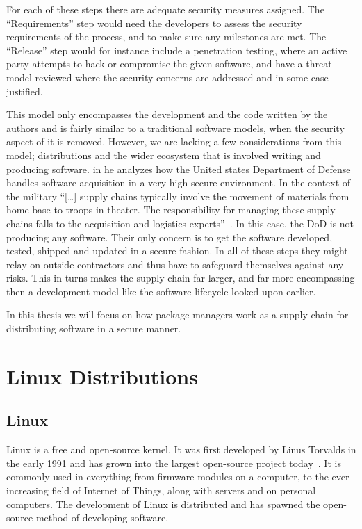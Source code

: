 \documentclass[../Main/thesis.tex]{subfiles}
\begin{document}
For each of these steps there are adequate security measures assigned. The
``Requirements'' step would need the developers to assess the security
requirements of the process, and to make sure any milestones are met. The
``Release'' step would for instance include a penetration testing, where an
active party attempts to hack or compromise the given software, and have a
threat model reviewed where the security concerns are addressed and in some case
justified.

This model only encompasses the development and the code written by the authors
and is fairly similar to a traditional software models, when the security aspect
of it is removed. However, we are lacking a few considerations from this model;
distributions and the wider ecosystem that is involved writing and producing
software. \citeauthor{rj-ellison-2010} in  he
analyzes how the United states Department of Defense handles software
acquisition in a very high secure environment. In the context of the military
``[\dots] supply chains typically involve the movement of materials from home
base to troops in theater. The responsibility for managing these supply chains
falls to the acquisition and logistics experts''~\cite{rj-ellison-2010}. In this
case, the DoD is not producing any software. Their only concern is to get the
software developed, tested, shipped and updated in a secure fashion. In all of
these steps they might relay on outside contractors and thus have to safeguard
themselves against any risks. This in turns makes the supply chain far larger, and
far more encompassing then a development model like the software lifecycle
looked upon earlier.

In this thesis we will focus on how package managers work as a supply chain for
distributing software in a secure manner.

\section{Linux Distributions}\label{sec:linux_distributions}
\subsection*{Linux}
Linux is a free and open-source kernel. It was first developed by Linus Torvalds
in the early 1991 and has grown into the largest open-source project
today~\cite{linuxfoundation-linux}. It is commonly used in everything from
firmware modules on a computer, to the ever increasing field of Internet of
Things, along with servers and on personal computers. The development of Linux is
distributed and has spawned the open-source method of developing software.
\end{document}
